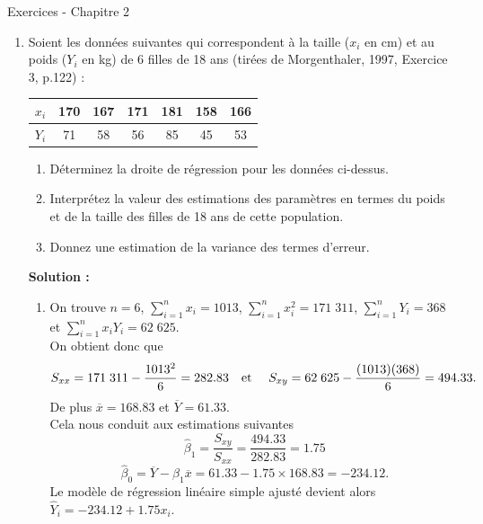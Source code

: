 \documentclass[letter, 11pt]{article}
\newcommand{\prof}[1]{\ifdefined\avecsolutions\par{\color{blue}\textbf{Solution :} #1}\par\fi}
\begin{document}
\vspace*{0.01 cm}
\begin{center}
{\Large Exercices - Chapitre 2}
\end{center}



\begin{enumerate}[leftmargin=*, wide, label=\bf Exercice \arabic*:]
\item
Soient les données suivantes qui correspondent à la taille ($x_i$ en cm) et au poids ($Y_i$ en kg) de 6 filles de 18 ans (tirées de Morgenthaler, 1997, Exercice 3, p.122) :

\begin{center}
\begin{tabular}{|c|c|c|c|c|c|c|}
\hline
$x_i$ & 170 & 167 & 171 & 181 & 158 & 166 \\\hline
$Y_i$ & 71 & 58 & 56 & 85 & 45 & 53\\\hline
\end{tabular}
\end{center}

\begin{enumerate}[label={\bf \alph*)}] 
\item Déterminez la droite de régression pour les données ci-dessus.
\item  Interprétez la valeur des estimations des paramètres en termes du poids et de la taille des filles de 18 ans de cette population.
\item  Donnez une estimation de la variance des termes d’erreur.
\end{enumerate}

\prof{\begin{enumerate}[label={\bf \alph*)}]
\item  On trouve $n = 6$, $\sum_{i=1}^n x_i = 1013$, $\sum_{i=1}^n x_i^2 = 171\;311$, $\sum_{i=1}^n Y_i = 368$ et $\sum_{i=1}^n x_iY_i = 62\;625$.\\
 On obtient donc que
    $$
    S_{xx} = 171\;311-\frac{1013^2}{6} = 282.83 \text{\quad et \quad} S_{xy} = 62\;625 -\frac{(1013)(368)}{6} = 494.33.
    $$
    De plus $\overline{x}= 168.83$ et $\overline{Y}= 61.33$. \\
		Cela nous conduit aux estimations suivantes $$\hat{\beta}_1= \frac{S_{xy}}{S_{xx}} = \frac{494.33}{282.83} = 1.75$$ $$\hat{\beta}_0 = \overline{Y} - \hat{\beta}_1\overline{x} = 61.33 - 1.75\times168.83 = -234.12.$$
		Le modèle de régression linéaire simple ajusté devient alors $\hat{Y}_i = -234.12 + 1.75x_i$.\\


\end{enumerate}}
\end{enumerate}
\end{document}
